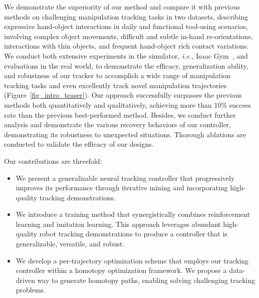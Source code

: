 We demonstrate the superiority of our method and compare it with previous methods on challenging manipulation tracking tasks in two datasets, describing expressive hand-object interactions in daily and functional tool-using scenarios, involving complex object movements, difficult and subtle in-hand re-orientations, interactions with thin objects, and frequent hand-object rich contact variations. 
We conduct both extensive experiments in the simulator, \emph{i.e.,} Isaac Gym~\citep{makoviychuk2021isaac}, and evaluations in the real world, to demonstrate the efficacy, generalization ability, and robustness of our tracker to accomplish a wide range of manipulation tracking tasks and even excellently track novel manipulation trajectories (Figure~\ref{fig_intro_teaser}).
Our approach successfully surpasses the previous methods both quantitatively and qualitatively, achieving more than 10\% success rate than the previous best-performed method. Besides, we conduct further analysis and demonstrate the various recovery behaviors of our controller, demonstrating its robustness to unexpected situations. Thorough ablations are conducted to validate the efficacy of our designs.

Our contributions are threefold:
\begin{itemize} %
    \item We present a generalizable neural tracking controller that progressively improves its performance through iterative mining and incorporating high-quality tracking demonstrations.
    \item We introduce a training method that synergistically combines reinforcement learning and imitation learning. This approach leverages abundant high-quality robot tracking demonstrations to produce a controller that is generalizable, versatile, and robust.
    \item We develop a per-trajectory optimization scheme that employs our tracking controller within a homotopy optimization framework. We propose a data-driven way to generate homotopy paths, enabling solving challenging tracking problems.
\end{itemize}



